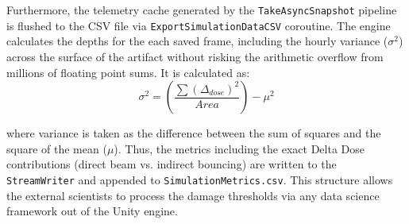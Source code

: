 Furthermore, the telemetry cache generated by the \texttt{TakeAsyncSnapshot} pipeline is flushed to the CSV file via \texttt{ExportSimulationDataCSV} coroutine. The engine calculates the depths for the each saved frame, including the hourly variance ($\sigma^2$) across the surface of the artifact without risking the arithmetic overflow from millions of floating point sums. It is calculated as:
\begin{equation}
    \sigma^2 = \left(\frac{\sum (\Delta_{dose})^2}{Area}\right) - \mu^2
\end{equation}

where variance is taken as the difference between the sum of squares and the square of the mean ($\mu$). Thus, the metrics including the exact Delta Dose contributions (direct beam vs. indirect bouncing) are written to the \texttt{StreamWriter} and appended to \texttt{SimulationMetrics.csv}. This structure allows the external scientists to process the damage thresholds via any data science framework out of the Unity engine.
